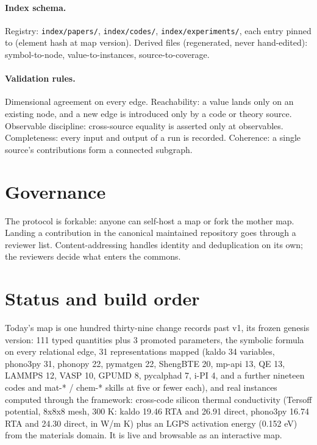 \documentclass[11pt,a4paper]{article}
\begin{document}
\paragraph{Index schema.} Registry: \texttt{index/papers/}, \texttt{index/codes/},
\texttt{index/experiments/}, each entry pinned to (element hash at map version).
Derived files (regenerated, never hand-edited): symbol-to-node,
value-to-instances, source-to-coverage.

\paragraph{Validation rules.} Dimensional agreement on every edge. Reachability: a value
lands only on an existing node, and a new edge is introduced only by a code or
theory source. Observable discipline: cross-source equality is asserted only at
observables. Completeness: every input and output of a run is recorded.
Coherence: a single source's contributions form a connected subgraph.

\section{Governance}

The protocol is forkable: anyone can self-host a map or fork the mother map.
Landing a contribution in the canonical maintained repository goes through a
reviewer list. Content-addressing handles identity and deduplication on its own;
the reviewers decide what enters the commons.

\section{Status and build order}

Today's map is one hundred thirty-nine change records past v1, its frozen genesis version:
111 typed quantities plus 3 promoted
parameters, the symbolic formula on every relational edge, 31 representations
mapped (kaldo 34 variables, phono3py 31, phonopy 22, pymatgen 22, ShengBTE 20,
mp-api 13, QE 13, LAMMPS 12, VASP 10, GPUMD 8, pycalphad 7, i-PI 4, and a further
nineteen codes and mat-* / chem-* skills at five or fewer each), and real instances
computed through the framework: cross-code silicon thermal conductivity
(Tersoff potential, 8x8x8 mesh, 300 K: kaldo 19.46 RTA and 26.91 direct,
phono3py 16.74 RTA and 24.30 direct, in W/m K) plus an LGPS activation energy
(0.152 eV) from the materials domain. It is live and browsable as an
interactive map.
\end{document}
